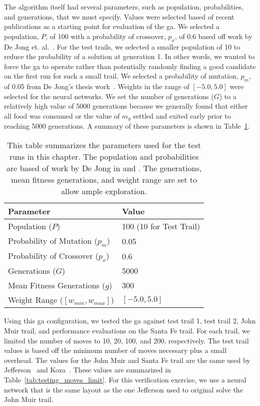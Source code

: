 The algorithm itself had several parameters, such as population, probabilities, and generations, that we must specify. Values were selected based of recent publications as a starting point for evaluation of the \gls{ga}. We selected a population, $P$, of 100 with a probability of crossover, $p_x$, of 0.6 based off work by De Jong et. al.~\cite{De_Jong1991-cq}. For the test trails, we selected a smaller population of 10 to reduce the probability of a solution at generation 1. In other words, we wanted to force the \gls{ga} to operate rather than potentially randomly finding a good candidate on the first run for such a small trail. We selected a probability of mutation, $p_m$, of 0.05 from De Jong's thesis work~\cite{De_Jong1975-wc}. Weights in the range of $[-5.0, 5.0]$ were selected for the neural networks. We set the number of generations ($G$) to a relatively high value of 5000 generations because we generally found that either all food was consumed or the value of $m_g$ settled and exited early prior to reaching 5000 generations. A summary of these parameters is shown in Table~\ref{tab:testing_run_parameters}.

\begin{table}[ht]
\centering
\begin{tabular}{ll}
\textbf{Parameter}                  & \textbf{Value} \\ \hline
Population ($P$)                    & 100 (10 for Test Trail)   \\
Probability of Mutation ($p_m$)     & 0.05  \\
Probability of Crossover ($p_x$)    & 0.6  \\
Generations ($G$)                   & 5000  \\
Mean Fitness Generations ($g$)      & 300  \\
Weight Range ($[w_{min}, w_{max}]$) & $[-5.0, 5.0]$
\end{tabular}
\caption[Summary of GA Parameters for Test Runs]{This table summarizes the parameters used for the test runs in this chapter. The population and probabilities are based of work by De Jong in \cite{De_Jong1991-cq} and \cite{De_Jong1975-wc}. The generations, mean fitness generations, and weight range are set to allow ample exploration.}
\label{tab:testing_run_parameters}
\end{table}

Using this \gls{ga} configuration, we tested the \gls{ga} against test trail 1, test trail 2, John Muir trail, and performance evaluations on the Santa Fe trail. For each trail, we limited the number of moves to 10, 20, 100, and 200, respectively. The test trail values is based off the minimum number of moves necessary plus a small overhead. The values for the John Muir and Santa Fe trail are the same used by Jefferson~\cite{Jefferson1992-ph} and Koza~\cite{Koza1992-xs}. These values are summarized in Table~\ref{tab:testing_moves_limit}. For this verification exercise, we use a neural network that is the same layout as the one Jefferson used to original solve the John Muir trail. 

